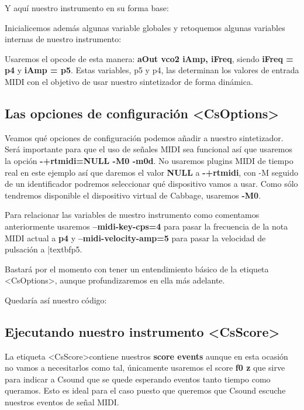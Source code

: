Y aquí nuestro instrumento en su forma base:

Inicialicemos además algunas variable globales y retoquemos algunas variables internas de nuestro instrumento:


Usaremos el opcode de esta manera: \textbf{aOut vco2 iAmp, iFreq}, siendo \textbf{iFreq = p4} y \textbf{iAmp = p5}. Estas variables, p5 y p4, las determinan los valores de entrada MIDI con el objetivo de usar nuestro sintetizador de forma dinámica.

\subsection{Las opciones de configuración \textless CsOptions\textgreater}\label{sec:optSinte}

Veamos qué opciones de configuración podemos añadir a nuestro sintetizador. Será importante para que el uso de señales MIDI sea funcional así que usaremos la opción \textbf{-+rtmidi=NULL -M0 -m0d}. No usaremos plugins MIDI de tiempo real en este ejemplo así que daremos el valor \textbf{NULL} a \textbf{-+rtmidi}, con -M seguido de un identificador podremos seleccionar qué dispositivo vamos a usar. Como sólo tendremos disponible el dispositivo virtual de Cabbage, usaremos \textbf{-M0}. 

Para relacionar las variables de nuestro instrumento como comentamos anteriormente usaremos \textbf{--midi-key-cps=4} para pasar la frecuencia de la nota MIDI actual a \textbf{p4} y \textbf{--midi-velocity-amp=5} para pasar la velocidad de pulsación a |textbf{p5}.

Bastará por el momento con tener un entendimiento básico de la etiqueta \textless CsOptions\textgreater , aunque profundizaremos en ella más adelante.

Quedaría así nuestro código:


\subsection{Ejecutando nuestro instrumento \textless CsScore\textgreater}\label{sec:scoreSinte}

La etiqueta \textless CsScore\textgreater contiene nuestros \textbf{score events} aunque en esta ocasión no vamos a necesitarlos como tal, únicamente usaremos el score \textbf{f0 z} que sirve para indicar a Csound que se quede esperando eventos tanto tiempo como queramos. Esto es ideal para el caso puesto que queremos que Csound escuche nuestros eventos de señal MIDI.

